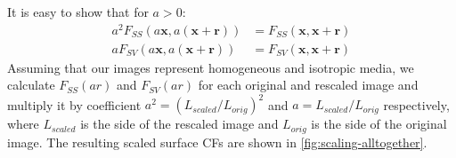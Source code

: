 \documentclass[reprint,amsmath,amssymb,aps,pre,showkeys,showpacs]{revtex4-1}
\begin{document}
It is easy to show that for $a > 0$:
\begin{align}
  a^2 F_{SS}(a \mathbf{x}, a(\mathbf{x} + \mathbf{r})) &= F_{SS}(\mathbf{x},
  \mathbf{x} + \mathbf{r}) \label{eq:scale-ss} \\
  a F_{SV}(a \mathbf{x}, a(\mathbf{x} + \mathbf{r})) &= F_{SV}(\mathbf{x},
  \mathbf{x} + \mathbf{r}) \label{eq:scale-sv}
\end{align}
Assuming that our images represent homogeneous and isotropic media, we calculate
$F_{SS}(ar)$ and $F_{SV}(ar)$ for each original and rescaled image and multiply
it by coefficient $a^2 = (L_{scaled}/L_{orig})^2$ and $a = L_{scaled}/L_{orig}$
respectively, where $L_{scaled}$ is the side of the rescaled image and
$L_{orig}$ is the side of the original image. The resulting scaled surface CFs
are shown in \cref{fig:scaling-alltogether}.
\end{document}
